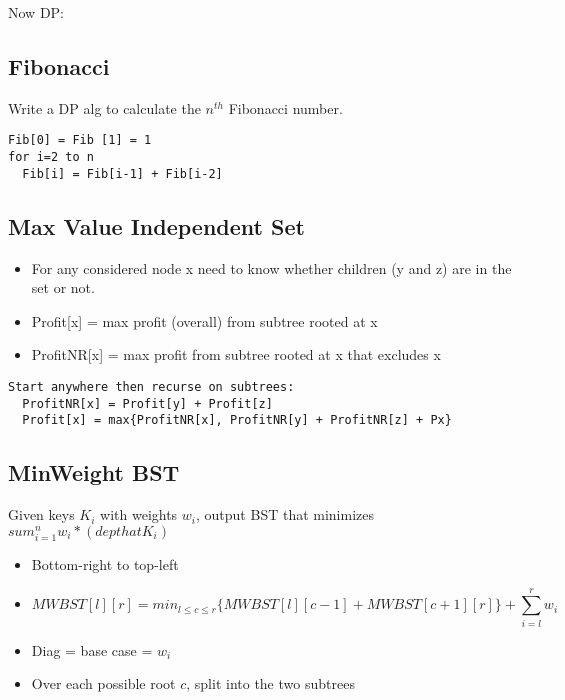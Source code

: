 \documentclass[12pt]{article}
\providecommand{\tightlist}{
    \setlength{\itemsep}{0pt}\setlength{\parskip}{0pt}
}
\begin{document}
\pagebreak

Now DP:


\subsection{Fibonacci}
Write a DP alg to calculate the $n^{th}$ Fibonacci number.\\
\begin{verbatim}
Fib[0] = Fib [1] = 1
for i=2 to n
  Fib[i] = Fib[i-1] + Fib[i-2]
\end{verbatim}

\subsection{Max Value Independent Set}
\begin{itemize}\tightlist
  \item For any considered node x need to know whether children (y and z) are in the set or not.
  \item Profit[x] = max profit (overall) from subtree rooted at x
  \item ProfitNR[x] = max profit from subtree rooted at x that excludes x
\end{itemize}
\begin{verbatim}
Start anywhere then recurse on subtrees:
  ProfitNR[x] = Profit[y] + Profit[z]
  Profit[x] = max{ProfitNR[x], ProfitNR[y] + ProfitNR[z] + Px}
\end{verbatim}


\subsection{MinWeight BST}
Given keys $K_i$ with weights $w_i$, output BST that minimizes $sum_{i=1}^n w_i * (depth at K_i)$\\
\begin{itemize}
  \item Bottom-right to top-left
  \item $$MWBST[l][r] = min_{l\leq c\leq r}\{MWBST[l][c-1] + MWBST[c+1][r]\} + \sum_{i=l}^r w_i$$
  \item Diag = base case = $w_i$
  \item Over each possible root $c$, split into the two subtrees
\end{itemize}
\end{document}

